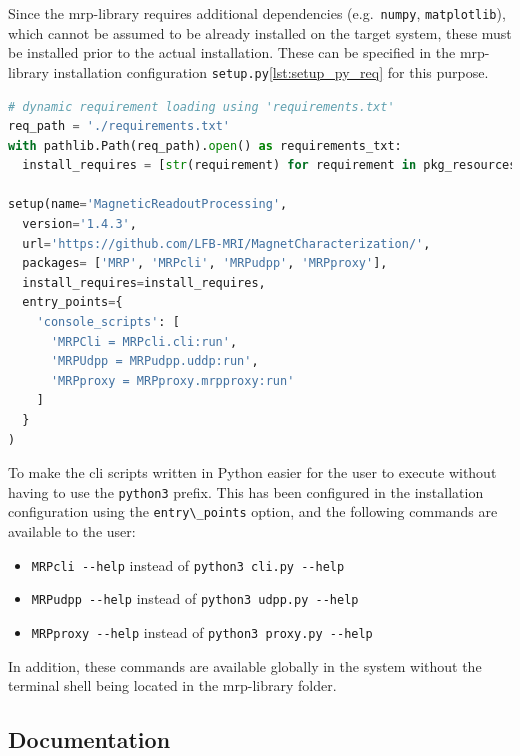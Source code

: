 Since the \gls{mrp}-library requires additional dependencies
(e.g.~\passthrough{\lstinline!numpy!},
\passthrough{\lstinline!matplotlib!}), which cannot be assumed to be
already installed on the target system, these must be installed prior to
the actual installation. These can be specified in the \gls{mrp}-library
installation configuration
\passthrough{\lstinline!setup.py!}\ref{lst:setup_py_req} for this
purpose.

\begin{lstlisting}[language=Python, caption={setup.py with dynamic requirement parsing used given requirements.txt}, label=lst:setup_py_req]
# dynamic requirement loading using 'requirements.txt'
req_path = './requirements.txt'
with pathlib.Path(req_path).open() as requirements_txt:
  install_requires = [str(requirement) for requirement in pkg_resources.parse_requirements(requirements_txt)]

setup(name='MagneticReadoutProcessing',
  version='1.4.3',
  url='https://github.com/LFB-MRI/MagnetCharacterization/',
  packages= ['MRP', 'MRPcli', 'MRPudpp', 'MRPproxy'],
  install_requires=install_requires,
  entry_points={
    'console_scripts': [
      'MRPCli = MRPcli.cli:run',
      'MRPUdpp = MRPudpp.uddp:run',
      'MRPproxy = MRPproxy.mrpproxy:run'
    ]
  }
)
\end{lstlisting}

To make the \gls{cli} scripts written in Python easier for the user to
execute without having to use the \passthrough{\lstinline!python3!}
prefix. This has been configured in the installation configuration using
the \passthrough{\lstinline!entry\_points!} option, and the following
commands are available to the user:

\begin{itemize}
\tightlist
\item
  \passthrough{\lstinline!MRPcli --help!} instead of
  \passthrough{\lstinline!python3 cli.py --help!}
\item
  \passthrough{\lstinline!MRPudpp --help!} instead of
  \passthrough{\lstinline!python3 udpp.py --help!}
\item
  \passthrough{\lstinline!MRPproxy --help!} instead of
  \passthrough{\lstinline!python3 proxy.py --help!}
\end{itemize}

In addition, these commands are available globally in the system without
the terminal shell being located in the \gls{mrp}-library folder.

\hypertarget{documentation}{%
\subsection{Documentation}\label{documentation}}

